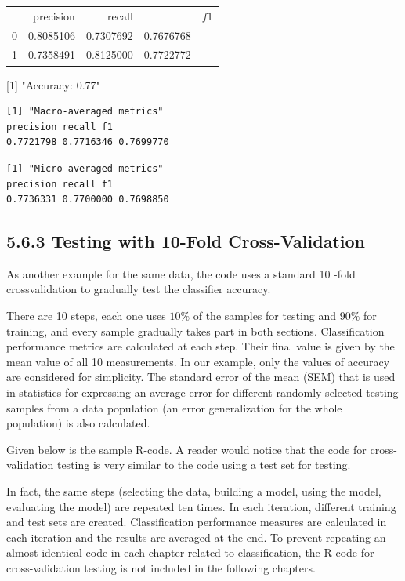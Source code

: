 \documentclass[10pt]{book}
\begin{document}
\begin{center}
\begin{tabular}{rrrrr}
 & precision & recall &  & $f 1$ \\
0 & 0.8085106 & 0.7307692 & 0.7676768 &  \\
1 & 0.7358491 & 0.8125000 & 0.7722772 &  \\
\end{tabular}
\end{center}

[1] "Accuracy: 0.77"

\begin{verbatim}
[1] "Macro-averaged metrics"
precision recall f1
0.7721798 0.7716346 0.7699770
\end{verbatim}

\begin{verbatim}
[1] "Micro-averaged metrics"
precision recall f1
0.7736331 0.7700000 0.7698850
\end{verbatim}

\subsection*{5.6.3 Testing with 10-Fold Cross-Validation}
As another example for the same data, the code uses a standard 10 -fold crossvalidation to gradually test the classifier accuracy.

There are 10 steps, each one uses $10 \%$ of the samples for testing and $90 \%$ for training, and every sample gradually takes part in both sections. Classification performance metrics are calculated at each step. Their final value is given by the mean value of all 10 measurements. In our example, only the values of accuracy are considered for simplicity. The standard error of the mean (SEM) that is used in statistics for expressing an average error for different randomly selected testing samples from a data population (an error generalization for the whole population) is also calculated.

Given below is the sample R-code. A reader would notice that the code for cross-validation testing is very similar to the code using a test set for testing.

In fact, the same steps (selecting the data, building a model, using the model, evaluating the model) are repeated ten times. In each iteration, different training and test sets are created. Classification performance measures are calculated in each iteration and the results are averaged at the end. To prevent repeating an almost identical code in each chapter related to classification, the R code for cross-validation testing is not included in the following chapters.
\end{document}
